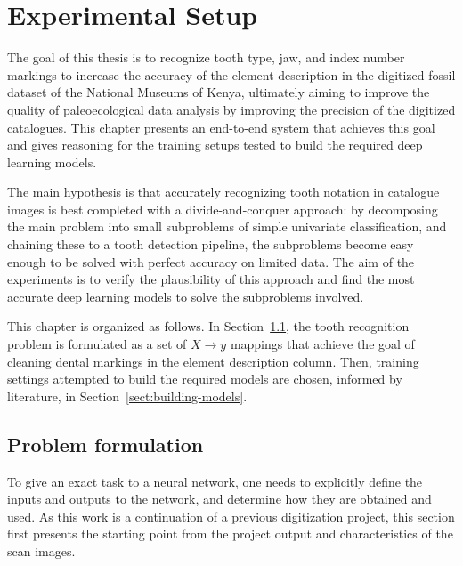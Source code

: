 \documentclass[english,twoside,openright]{UH_DS_MSc}
\begin{document}
\chapter{Experimental Setup}

The goal of this thesis is to recognize tooth type,
jaw, and index number markings to increase the accuracy of the element description in
the digitized fossil dataset of the National Museums of Kenya, ultimately aiming to improve the quality of paleoecological data analysis by improving the precision of the digitized catalogues. This 
chapter presents an end-to-end system that achieves this goal and gives reasoning 
for the training setups tested to build  the required deep learning models.

The main hypothesis is that accurately recognizing tooth notation in catalogue images 
is best completed with a divide-and-conquer approach: by decomposing the main problem into small
subproblems of simple univariate classification, and chaining these to a tooth detection pipeline,
the subproblems become easy enough to be solved with perfect accuracy on limited data.
The aim of the experiments is to verify the plausibility of this approach and find the most accurate deep 
learning models to solve the subproblems involved.

This chapter is organized as follows. In Section~\ref{sect:problem-formulation}, the tooth recognition problem is formulated as a set of $X\to y$ 
mappings that achieve the goal of cleaning dental markings in the element description column.
Then, training settings attempted to build the required models are chosen, informed by literature, in Section~\ref{sect:building-models}.

\section{Problem formulation}
\label{sect:problem-formulation}

To give an exact task to a neural network, one needs to explicitly define 
the inputs and outputs to the network, and determine how they are obtained and used.
 As this work is a continuation of 
a previous digitization project, this section first presents the starting point 
from the project output and characteristics of the scan images. 
\end{document}
